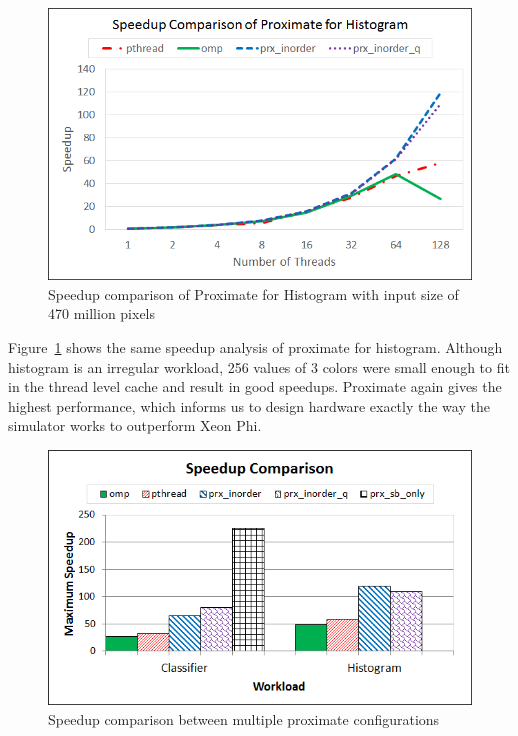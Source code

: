 \begin{figure}
  \begin{center}
    \includegraphics[width=\linewidth]{cs758-figs/speedup-histogram.png}
  \end{center}
\vspace{-0.2in}
  \caption{Speedup comparison of Proximate for Histogram with input size of 470 million pixels}
  \label{fig:speedup-histogram}
\vspace{-0.05in}
\end{figure}

Figure~\ref{fig:speedup-histogram} shows the same speedup analysis of proximate 
for histogram. Although histogram is an irregular workload, 256 values of 3 
colors were small enough to fit in the thread level cache and result in good 
speedups. Proximate again gives the highest performance, which informs us to 
design hardware exactly the way the simulator works to outperform Xeon Phi. 


\begin{figure}
  \begin{center}
    \includegraphics[width=\linewidth]{cs758-figs/speedup-comparison.png}
  \end{center}
\vspace{-0.2in}
  \caption{Speedup comparison between multiple proximate configurations}
  \label{fig:speedup-comparison}
\vspace{-0.05in}
\end{figure}

